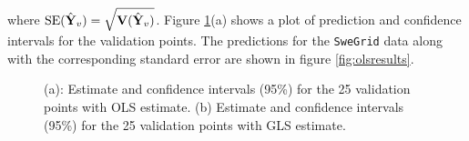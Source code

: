 \documentclass[a4paper,10pt]{article}
\def\bY{{\bf Y}}
\def\bV{{\bf V}}
\begin{document}
where $\text{SE}(\hat \bY_v) = \sqrt{\bV(\hat \bY_v)}$. Figure \ref{fig:olsglsval}(a) shows a plot of prediction and confidence intervals for the validation points. The predictions for the {\texttt{SweGrid}} data along with the corresponding standard error are shown in figure \ref{fig:olsresults}.
\begin{figure}[ht]
\centering
  \qquad
  \caption{(a): Estimate and confidence intervals (95\%) for the 25 validation points with OLS estimate. (b) Estimate and confidence intervals (95\%) for the 25 validation points with GLS estimate.}
\label{fig:olsglsval}
\end{figure}
\end{document}
